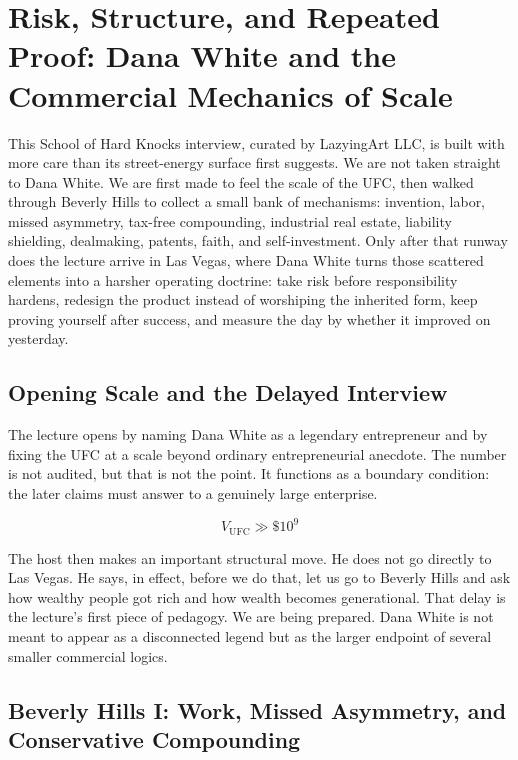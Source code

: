 \chapter{Risk, Structure, and Repeated Proof: Dana White and the Commercial Mechanics of Scale}

This School of Hard Knocks interview, curated by LazyingArt LLC, is built with more care than its street-energy surface first suggests. We are not taken straight to Dana White. We are first made to feel the scale of the UFC, then walked through Beverly Hills to collect a small bank of mechanisms: invention, labor, missed asymmetry, tax-free compounding, industrial real estate, liability shielding, dealmaking, patents, faith, and self-investment. Only after that runway does the lecture arrive in Las Vegas, where Dana White turns those scattered elements into a harsher operating doctrine: take risk before responsibility hardens, redesign the product instead of worshiping the inherited form, keep proving yourself after success, and measure the day by whether it improved on yesterday.

\section{Opening Scale and the Delayed Interview}

The lecture opens by naming Dana White as a legendary entrepreneur and by fixing the UFC at a scale beyond ordinary entrepreneurial anecdote. The number is not audited, but that is not the point. It functions as a boundary condition: the later claims must answer to a genuinely large enterprise.

\begin{equation}
V_{\mathrm{UFC}} \gg \$10^9
\end{equation}

The host then makes an important structural move. He does not go directly to Las Vegas. He says, in effect, before we do that, let us go to Beverly Hills and ask how wealthy people got rich and how wealth becomes generational. That delay is the lecture's first piece of pedagogy. We are being prepared. Dana White is not meant to appear as a disconnected legend but as the larger endpoint of several smaller commercial logics.

\section{Beverly Hills I: Work, Missed Asymmetry, and Conservative Compounding}

